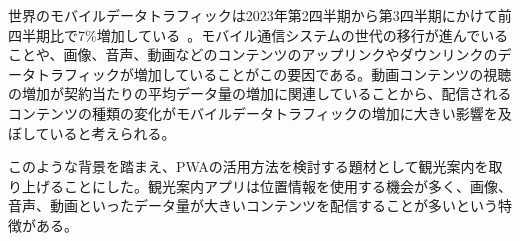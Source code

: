 世界のモバイルデータトラフィックは2023年第2四半期から第3四半期にかけて前四半期比で7\%増加している~\cite{EricssonMobilityReportDataAndForecastsNovember2023}。モバイル通信システムの世代の移行が進んでいることや、画像、音声、動画などのコンテンツのアップリンクやダウンリンクのデータトラフィックが増加していることがこの要因である。動画コンテンツの視聴の増加が契約当たりの平均データ量の増加に関連していることから、配信されるコンテンツの種類の変化がモバイルデータトラフィックの増加に大きい影響を及ぼしていると考えられる。

このような背景を踏まえ、PWAの活用方法を検討する題材として観光案内を取り上げることにした。観光案内アプリは位置情報を使用する機会が多く、画像、音声、動画といったデータ量が大きいコンテンツを配信することが多いという特徴がある。
